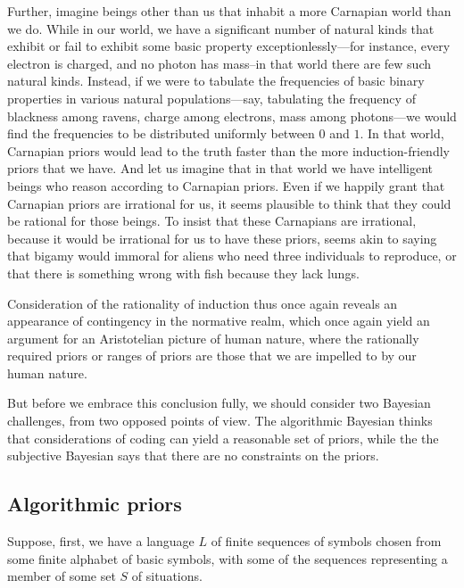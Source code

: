 Further, imagine beings other than us that inhabit a more Carnapian world than we do. While in our world, we have a significant number of natural kinds
that exhibit or fail to exhibit some basic property exceptionlessly---for instance, every electron is charged, and no photon 
has mass--in that world there are few such natural kinds. Instead, if we were to tabulate the frequencies of basic binary properties
in various natural populations---say, tabulating the frequency of blackness among ravens, charge among electrons, mass among photons---we 
would find the frequencies to be distributed uniformly between $0$ and $1$. In that world, Carnapian priors would lead to the truth faster
than the more induction-friendly priors that we have. And let us imagine that in that world we have intelligent beings who reason according
to Carnapian priors. Even if we happily grant that Carnapian priors are irrational for us, it seems plausible to think that they could be
rational for those beings. To insist that these Carnapians are irrational, because it would be irrational for us to have these priors,
seems akin to saying that bigamy would immoral for aliens who need three individuals to reproduce, or that there is something wrong with fish
because they lack lungs. 

Consideration of the rationality of induction thus once again reveals an appearance of contingency in the normative realm, which
once again yield an argument for an Aristotelian picture of human nature, where the rationally required priors or ranges of priors
are those that we are impelled to by our human nature.

But before we embrace this conclusion fully, we should consider two Bayesian challenges, from two opposed points of view.
The algorithmic Bayesian thinks that considerations of coding can yield a reasonable set of priors, while the 
the subjective Bayesian says that there are no constraints on the priors.

\subsection{Algorithmic priors}
Suppose, first, we have a language $L$ of finite sequences of symbols chosen from some finite alphabet of basic symbols, 
with some of the sequences representing a member of some set $S$ of situations. 

